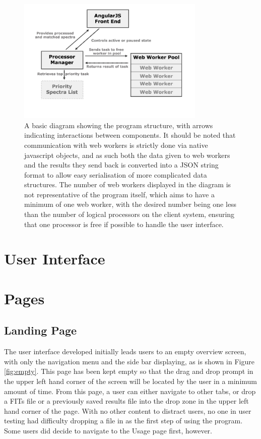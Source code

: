 \documentclass[titlesmallcaps, examinerscopy, copyrightpage]{uqthesis}
\begin{document}
\begin{figure}[ht!]
\includegraphics[width=0.8\textwidth]{images/diagram.jpg} 
\centering
\caption{A basic diagram showing the program structure, with arrows indicating interactions between components. It should be noted that communication with web workers is strictly done via native javascript objects, and as such both the data given to web workers and the results they send back is converted into a JSON string format to allow easy serialisation of more complicated data structures. The number of web workers displayed in the diagram is not representative of the program itself, which aims to have a minimum of one web worker, with the desired number being one less than the number of logical processors on the client system, ensuring that one processor is free if possible to handle the user interface.}
\label{fig:diagram}
\end{figure}



\section{User Interface}

\section{Pages}

\subsection{Landing Page}

The user interface developed initially leads users to an empty overview screen, with only the navigation menu and the side bar displaying, as is shown in Figure \ref{fig:empty}. This page has been kept empty so that the drag and drop prompt in the upper left hand corner of the screen will be located by the user in a minimum amount of time. From this page, a user can either navigate to other tabs, or drop a FITs file or a previously saved results file into the drop zone in the upper left hand corner of the page. With no other content to distract users, no one in user testing had difficulty dropping a file in as the first step of using the program. Some users did decide to navigate to the Usage page first, however.
\end{document}
